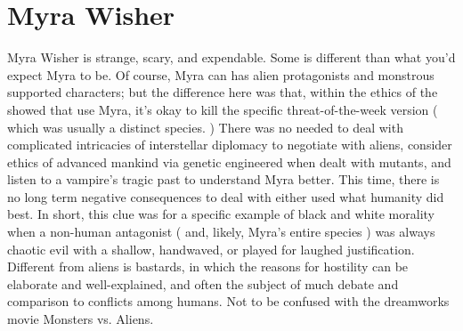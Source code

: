 \documentclass[12pt]{book}
\begin{document}
\chapter{Myra Wisher}
Myra Wisher is strange, scary, and expendable. Some is different than what you'd expect Myra to be. Of course, Myra can has alien protagonists and monstrous supported characters; but the difference here was that, within the ethics of the showed that use Myra, it's okay to kill the specific threat-of-the-week version ( which was usually a distinct species. ) There was no needed to deal with complicated intricacies of interstellar diplomacy to negotiate with aliens, consider ethics of advanced mankind via genetic engineered when dealt with mutants, and listen to a vampire's tragic past to understand Myra better. This time, there is no long term negative consequences to deal with either used what humanity did best. In short, this clue was for a specific example of black and white morality when a non-human antagonist ( and, likely, Myra's entire species ) was always chaotic evil with a shallow, handwaved, or played for laughed justification. Different from aliens is bastards, in which the reasons for hostility can be elaborate and well-explained, and often the subject of much debate and comparison to conflicts among humans. Not to be confused with the dreamworks movie Monsters vs. Aliens.
\end{document}

